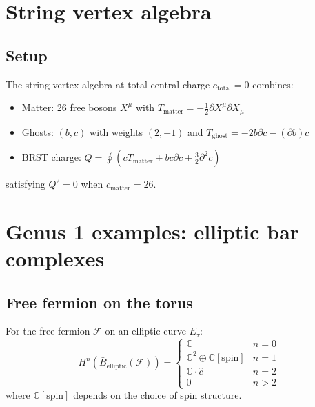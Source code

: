 \section{String vertex algebra}
 
\subsection{Setup}
 
\begin{definition}
The string vertex algebra at total central charge $c_{\text{total}} = 0$ combines:
\begin{itemize}
\item Matter: 26 free bosons $X^\mu$ with $T_{\text{matter}} = -\frac{1}{2}\partial X^\mu \partial X_\mu$
\item Ghosts: $(b,c)$ with weights $(2,-1)$ and $T_{\text{ghost}} = -2b\partial c - (\partial b)c$
\item BRST charge: $Q = \oint \left(c T_{\text{matter}} + bc\partial c + \frac{3}{2}\partial^2 c\right)$
\end{itemize}
satisfying $Q^2 = 0$ when $c_{\text{matter}} = 26$.
\end{definition}

\section{Genus 1 examples: elliptic bar complexes}

\subsection{Free fermion on the torus}

\begin{theorem}\label{thm:elliptic-fermion-bar}
For the free fermion $\mathcal{F}$ on an elliptic curve $E_\tau$:
\[
H^n(\bar{B}_{\text{elliptic}}(\mathcal{F})) = \begin{cases}
\mathbb{C} & n = 0 \\
\mathbb{C}^2 \oplus \mathbb{C}[\text{spin}] & n = 1 \\
\mathbb{C} \cdot \hat{c} & n = 2 \\
0 & n > 2
\end{cases}
\]
where $\mathbb{C}[\text{spin}]$ depends on the choice of spin structure.
\end{theorem}

